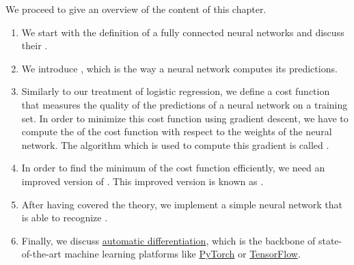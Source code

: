 We proceed to give an overview of the content of this chapter.
\begin{enumerate}
\item We start with the definition of a fully connected  neural networks and discuss their
  . 
\item We introduce , which is the way a neural network computes its predictions.
\item Similarly to our treatment of logistic regression, we define a cost function that measures the quality of
      the predictions of a neural network on a training set.  In order to minimize this cost function using
      gradient descent, we have to compute the  of the cost function with respect to the weights of the
      neural network.  The algorithm which is used to compute this gradient is called .
\item In order to find the minimum of the cost function efficiently, we need an improved version of
      .  This improved version is known as .
\item After having covered the theory, we implement a simple neural network that is able to recognize
      .
\item Finally, we discuss \href{https://en.wikipedia.org/wiki/Automatic_differentiation}{automatic
      differentiation}, which is the backbone of state-of-the-art machine learning platforms like
      \href{https://pytorch.org/}{PyTorch} or \href{https://www.tensorflow.org/}{TensorFlow}.
\end{enumerate}

